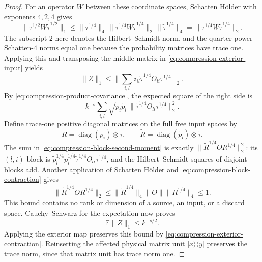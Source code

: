\documentclass[11pt]{article}
\numberwithin{equation}{section}
\theoremstyle{definition}
\theoremstyle{remark}
\newcommand{\norm}[1]{\lVert #1\rVert}
\begin{document}
\begin{proof}
For an operator $W$ between these coordinate spaces, Schatten
H\"older with exponents $4,2,4$ gives
\begin{equation}
 \norm{\tau^{1/2}W\widetilde\tau^{1/2}}_1
 \le\norm{\tau^{1/4}}_4\,
       \norm{\tau^{1/4}W\widetilde\tau^{1/4}}_2\,
       \norm{\widetilde\tau^{1/4}}_4
 =\norm{\tau^{1/4}W\widetilde\tau^{1/4}}_2.
 \label{eq:compression-quarter-powers}
\end{equation}
The subscript $2$ here denotes the Hilbert--Schmidt norm, and the
quarter-power Schatten-$4$ norms equal one because the probability
matrices have trace one.  Applying this and transposing the middle
matrix in \eqref{eq:compression-exterior-input} yields
\[
 \norm{Z}_1\le
 \norm{\sum_{i,l}z_{il}
             \widetilde\tau^{1/4}O_{li}\tau^{1/4}}_2.
\]
By \eqref{eq:compression-product-covariance}, the expected square of
the right side is
\begin{equation}
 k^{-s}\sum_{i,l}\sqrt{p_i\widetilde p_l}\,
          \norm{\widetilde\tau^{1/4}O_{li}\tau^{1/4}}_2^2.
 \label{eq:compression-block-second-moment}
\end{equation}
Define trace-one positive diagonal matrices on the full free input
spaces by
\[
 R=\operatorname{diag}(p_i)\otimes\tau,
 \qquad
 \widetilde R=\operatorname{diag}(\widetilde p_l)
                                      \otimes\widetilde\tau.
\]
The sum in \eqref{eq:compression-block-second-moment} is exactly
$\norm{\widetilde R^{1/4}OR^{1/4}}_2^2$: its $(l,i)$ block is
$\widetilde p_l^{1/4}p_i^{1/4}
 \widetilde\tau^{1/4}O_{li}\tau^{1/4}$, and the
Hilbert--Schmidt squares of disjoint blocks add.  Another application
of Schatten H\"older and \eqref{eq:compression-block-contraction} gives
\begin{equation}
 \norm{\widetilde R^{1/4}OR^{1/4}}_2
   \le\norm{\widetilde R^{1/4}}_4\norm{O}\norm{R^{1/4}}_4
   \le1.
 \label{eq:compression-dimension-free}
\end{equation}
This bound contains no rank or dimension of a source, an input, or a
discard space.  Cauchy--Schwarz for the expectation now proves
\begin{equation}
 \mathbb E\norm{Z}_1\le k^{-s/2}.
 \label{eq:compression-one-choice}
\end{equation}
Applying the exterior map preserves this bound by
\eqref{eq:compression-exterior-contraction}.  Reinserting the affected
physical matrix unit $|x\rangle\langle y|$ preserves the trace norm,
since that matrix unit has trace norm one.


\end{proof}
\end{document}
